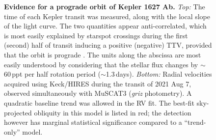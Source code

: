 \documentclass[12pt,modern,twocolumn,tighten]{aastex63}
\begin{document}
\begin{figure}[tp]
	\begin{center}
		\leavevmode
		
	\end{center}
	\vspace{-0.7cm}
	\caption{
		{\bf Evidence for a prograde orbit of Kepler 1627 Ab.}
    {\it Top:} 
    The time of each Kepler transit was measured, along with the local
    slope of the light curve.  The two quantities appear
    anti-correlated, which is most easily explained by starspot
    crossings during the first (second) half of transit inducing a
    positive (negative) TTV, provided that the orbit is prograde
    \citep{mazeh_time_2015}.  The units along the abscissa are most
    easily understood by considering that the stellar flux
    changes by $\sim$60\,ppt per half rotation period
    ($\sim$1.3\,days).
    {\it Bottom:} Radial velocities acquired using Keck/HIRES during
    the transit of 2021 Aug 7, observed simultaneously with MuSCAT3
    ({\it griz} photometry).  A quadratic baseline trend was allowed
    in the RV fit.  The best-fit sky-projected obliquity in this model
    is listed in red; the detection however has marginal statistical
    significance compared to a ``trend-only'' model.
    \label{fig:obliquity}
	}
\end{figure}
\end{document}
